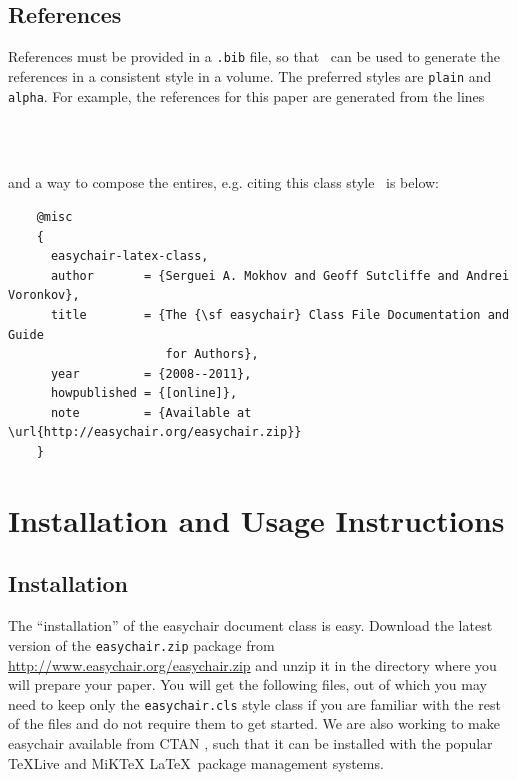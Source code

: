 \documentclass{easychair}
\newcommand{\easychair}{\textsf{easychair}}
\newcommand{\miktex}{MiK{\TeX}}
\begin{document}
\subsection{References}
\label{sect:references}

References must be provided in a {\tt .bib} file, so that \BibTeX\ can
be used to generate the references in a consistent style in a volume.
The preferred styles are {\tt plain} and {\tt alpha}.
For example, the references for this paper are generated from the
lines
\begin{verbatim}
    
    
\end{verbatim}
and a way to compose the entires, e.g. citing this class style~\cite{easychair-latex-class}
is below:
\small
\begin{verbatim}
    @misc
    {
      easychair-latex-class,
      author       = {Serguei A. Mokhov and Geoff Sutcliffe and Andrei Voronkov},
      title        = {The {\sf easychair} Class File Documentation and Guide
                      for Authors},
      year         = {2008--2011},
      howpublished = {[online]},
      note         = {Available at \url{http://easychair.org/easychair.zip}}
    }
\end{verbatim}
\normalsize

\section{Installation and Usage Instructions}
\label{sect:installation-usage}

\subsection{Installation}

The ``installation'' of the {\easychair} document class is easy.
Download the latest version of the \texttt{easychair.zip} package 
from \url{http://www.easychair.org/easychair.zip}
and unzip it in the directory where you will prepare your paper.
You will get the following files, out of which you may need to keep only 
the \texttt{easychair.cls} style class if you are familiar with the rest 
of the files and do not require them to get started.
We are also working to make {\easychair} available from CTAN \cite{ctan},
such that it can be installed with the popular \TeX Live \cite{texlive} and
{\miktex} \cite{miktex} \LaTeX\ package management systems.
\end{document}

